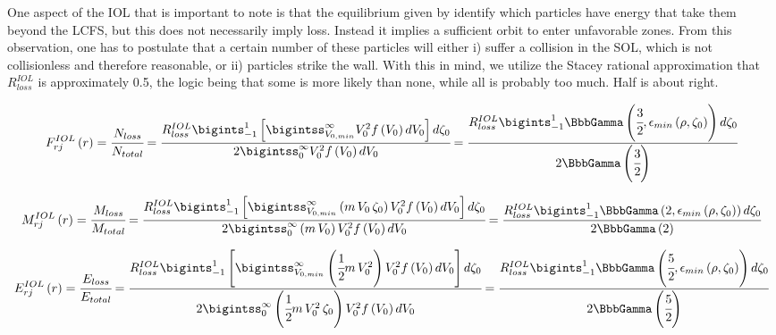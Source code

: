 One aspect of the \ac{IOL} that is important to note is that the equilibrium given by  identify which particles have energy that take them beyond the \ac{LCFS}, but this does not necessarily imply loss. Instead it implies a sufficient orbit to enter unfavorable zones. From this observation, one has to postulate that a certain number of these particles will either i) suffer a collision in the \ac{SOL}, which is not collisionless and therefore reasonable, or ii) particles strike the wall. With this in mind, we utilize the Stacey rational approximation that $R_{loss}^{IOL}$ is approximately 0.5, the logic being that some is more likely than none, while all is probably too much. Half is about right.

\begin{equation}
	F_{rj}^{IOL} \left( r \right) = \cfrac{N_{loss}}{N_{total}} = \cfrac{R_{loss}^{IOL} \bigints_{-1}^{1} \left[ \bigintss_{V_{0,min}}^{\infty} V_0^2 f\left( V_0 \right) dV_0\right] d \zeta_0}{2 \bigintss_{0}^{\infty} V_0^2 f\left(V_0\right)dV_0} = 
	\cfrac{R_{loss}^{IOL} \bigints_{-1}^{1} \BbbGamma \left(\cfrac{3}{2}, \epsilon_{min}\left(\rho,\zeta_0\right)   \right) d\zeta_0}{2 \BbbGamma \left(\cfrac{3}{2}\right)}
	\label{eqn:IOLCumulativeLossParticle}
\end{equation}

\begin{equation}
	M_{rj}^{IOL} \left( r \right) = \cfrac{M_{loss}}{M_{total}} = 
	\cfrac{R_{loss}^{IOL} \bigints_{-1}^{1} \left[ \bigintss_{V_{0,min}}^{\infty} 
		\left(m\,V_0\,\zeta_0\right) V_0^2 f\left( V_0 \right) dV_0\right] d\zeta_0}{2 \bigintss_{0}^{\infty} \left(m\,V_0\right) V_0^2 f\left(V_0\right)dV_0} = 
	\cfrac{R_{loss}^{IOL} \bigints_{-1}^{1} \BbbGamma \left(2, \epsilon_{min}\left(\rho,\zeta_0\right)   \right) d\zeta_0}{2 \BbbGamma \left(2\right)}
	\label{eqn:IOLCumulativeLossMomentum}
\end{equation}


\begin{equation}
	E_{rj}^{IOL} \left( r \right) = \cfrac{E_{loss}}{E_{total}} = \cfrac{R_{loss}^{IOL} \bigints_{-1}^{1} \left[ \bigintss_{V_{0,min}}^{\infty} \left(\cfrac{1}{2} m\,V_0^2\right) V_0^2 f\left( V_0 \right) dV_0\right] d\zeta_0}{2 \bigintss_{0}^{\infty} \left(\cfrac{1}{2} m\,V_0^2\,\zeta_0\right) V_0^2 f\left(V_0\right)dV_0} = 
	\cfrac{R_{loss}^{IOL} \bigints_{-1}^{1} \BbbGamma \left(\cfrac{5}{2}, \epsilon_{min}\left(\rho,\zeta_0\right)   \right) d\zeta_0}{2 \BbbGamma \left(\cfrac{5}{2}\right)} 
	\label{eqn:IOLCumulativeLossEnergy}
\end{equation}

